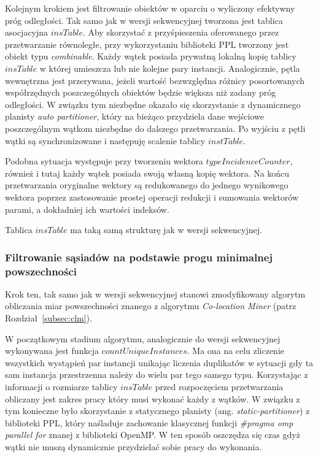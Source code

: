 \documentclass[12pt]{article}
\newcounter{algorytm}
\begin{document}
Kolejnym krokiem jest filtrowanie obiektów w oparciu o wyliczony efektywny próg odległości. Tak samo jak w wersji sekwencyjnej tworzona jest tablica asocjacyjna $ insTable $. Aby skorzystać z przyśpieszenia oferowanego przez przetwarzanie równoległe, przy wykorzystaniu biblioteki PPL tworzony jest obiekt typu \textit{combinable}. Każdy wątek posiada prywatną lokalną kopię tablicy $ insTable $ w której umieszcza lub nie kolejne pary instancji.  Analogicznie, pętla wewnętrzna jest przerywana, jeżeli wartość bezwzględna różnicy posortowanych współrzędnych poszczególnych obiektów będzie większa niż zadany próg odległości. W związku tym niezbędne okazało się skorzystanie z dynamicznego planisty \textit{auto partitioner}, który na bieżąco przydziela dane wejściowe poszczególnym wątkom niezbędne do dalszego przetwarzania. Po wyjściu z pętli wątki są synchronizowane i następuję scalenie tablicy $ instTable $.

Podobna sytuacja występuje przy tworzeniu wektora $ typeIncidenceCounter $, również i tutaj każdy wątek posiada swoją własną kopię wektora. Na końcu przetwarzania oryginalne wektory są redukowanego do jednego wynikowego wektora poprzez zastosowanie prostej operacji redukcji i sumowania wektorów parami, a dokładniej ich wartości indeksów.

Tablica $ insTable $ ma taką samą strukturę jak w wersji sekwencyjnej.

\subsubsection{Filtrowanie sąsiadów na podstawie progu minimalnej powszechności}

Krok ten, tak samo jak w wersji sekwencyjnej stanowi zmodyfikowany algorytm obliczania miar powszechności znanego z algorytmu \textit{Co-location Miner} (patrz Rozdział~\ref{subsec:clm}).

W początkowym stadium algorytmu, analogicznie do wersji sekwencyjnej wykonywana jest funkcja $ countUniqueInstances$. Ma ona na celu zliczenie wszystkich wystąpień par instancji unikając liczenia duplikatów w sytuacji gdy ta sam instancja przestrzenna należy do wielu par tego samego typu. Korzystając z informacji o rozmiarze tablicy $ insTable $ przed rozpoczęciem przetwarzania obliczany jest zakres pracy który musi wykonać każdy z wątków. W związku z tym konieczne było skorzystanie z statycznego planisty (ang. \textit{static-partitioner}) z biblioteki PPL, który naśladuje zachowanie klasycznej funkcji \textit{\#pragma omp parallel for} znanej z biblioteki OpenMP. W ten sposób oszczędza się czas gdyż wątki nie muszą dynamicznie przydzielać sobie pracy do wykonania.
\end{document}
